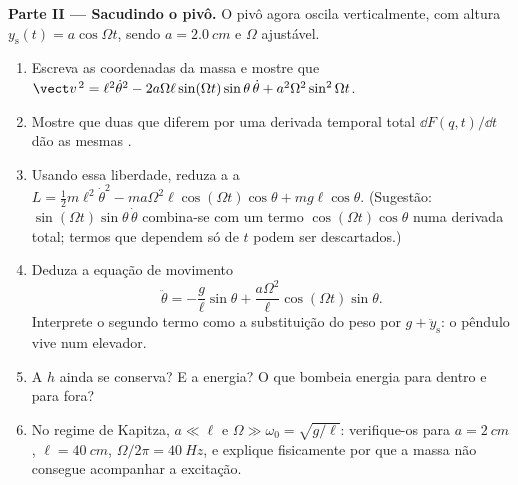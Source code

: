 \begin{problem}
\medskip\noindent\textbf{Parte II --- Sacudindo o pivô.}
O pivô agora oscila verticalmente, com altura $y_{\text{s}}(t) =
a\cos\Omega t$, sendo $a = \qty{2.0}{cm}$ e $\Omega$ ajustável.
\begin{enumerate}[resume]
  \item Escreva as coordenadas da massa e mostre que
        $\vect v^{\,2} = \ell^2\dot\theta^2 -
        2a\Omega\ell\sin(\Omega t)\sin\theta\,\dot\theta +
        a^2\Omega^2\sin^2\Omega t$.
  \item Mostre que duas  que diferem por uma derivada
        temporal total $\dd F(q,t)/\dd t$ dão as mesmas .
  \item Usando essa liberdade, reduza a  a $L = \tfrac12 m
        \ell^2\dot\theta^2 - ma\Omega^2\ell\cos(\Omega t)\cos\theta +
        mg\ell\cos\theta$. (Sugestão: $\sin(\Omega t)\sin\theta\,\dot\theta$
        combina-se com um termo $\cos(\Omega t)\cos\theta$ numa derivada
        total; termos que dependem só de $t$ podem ser descartados.)
  \item Deduza a equação de movimento
        \[
        \ddot\theta = -\frac{g}{\ell}\sin\theta
         + \frac{a\Omega^2}{\ell}\cos(\Omega t)\sin\theta .
        \]
        Interprete o segundo termo como a substituição do peso por $g +
        \ddot y_{\text{s}}$: o pêndulo vive num elevador.
  \item A  $h$ ainda se conserva? E a energia? O que
        bombeia energia para dentro e para fora?
  \item No regime de Kapitza, $a \ll \ell$ e $\Omega \gg \omega_0 =
        \sqrt{g/\ell}$: verifique-os para $a = \qty{2}{cm}$, $\ell =
        \qty{40}{cm}$, $\Omega/2\pi = \qty{40}{Hz}$, e explique
        fisicamente por que a massa não consegue acompanhar a excitação.
\end{enumerate}


\end{problem}
